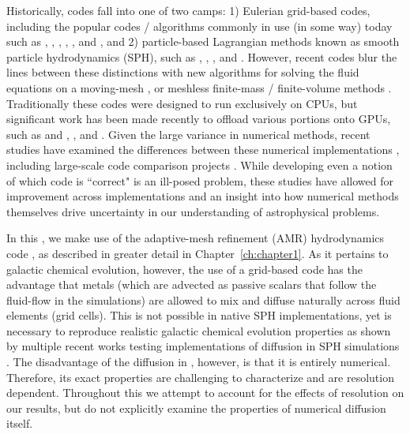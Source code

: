 Historically, codes fall into one of two camps: 1) Eulerian grid-based codes, including the popular codes / algorithms commonly in use (in some way) today such as  \citep{StoneNorman1992},  \citep{FLASH},  \citep{Teyssier2002},  \citep{Athena},  \citep{Rudd2008}, and  \citep{Enzo2014}, and 2) particle-based Lagrangian methods known as smooth particle hydrodynamics (SPH), such as  \citep{Springel2005},  \citep{Stadel2001},  \citep{Wadsley2004}, and  \citep{Menon2015}. However, recent codes blur the lines between these distinctions with new algorithms for solving the fluid equations on a moving-mesh \citep[e.g. ][]{Springel2010}, or meshless finite-mass / finite-volume methods \citep[such as those implemented in ][]{Hopkins2015}. Traditionally these codes were designed to run exclusively on CPUs, but significant work has been made recently to offload various portions onto GPUs, such as  and  \citep{Schive2010,Schive2018},  \citep{Kulikov2014}, and  \citep{Schneider2015}. Given the large variance in numerical methods, recent studies have examined the differences between these numerical implementations \citep[e.g.][]{Agertz2007}, including large-scale code comparison projects \citep[e.g.][]{AGORA,AGORA2}. While developing even a notion of which code is ``correct" is an ill-posed problem, these studies have allowed for improvement across implementations and an insight into how numerical methods themselves drive uncertainty in our understanding of astrophysical problems.

In this \Dissertation, we make use of the adaptive-mesh refinement (AMR) hydrodynamics code , as described in greater detail in Chapter~\ref{ch:chapter1}. As it pertains to galactic chemical evolution, however, the use of a grid-based code has the advantage that metals (which are advected as passive scalars that follow the fluid-flow in the simulations) are allowed to mix and diffuse naturally across fluid elements (grid cells). This is not possible in native SPH implementations, yet is necessary to reproduce realistic galactic chemical evolution properties as shown by multiple recent works testing implementations of diffusion in SPH simulations \citep[e.g.][]{Shen2010,Revaz2016,Hirai2017,Su2017a,Escala2018}. The disadvantage of the diffusion in , however, is that it is entirely numerical. Therefore, its exact properties are challenging to characterize and are resolution dependent. Throughout this \dissertation we attempt to account for the effects of resolution on our results, but do not explicitly examine the properties of numerical diffusion itself.


